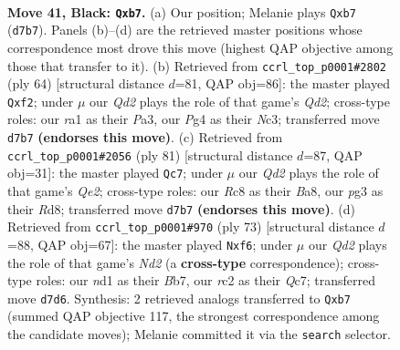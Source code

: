 \documentclass[11pt]{article}
\begin{document}
\begin{figure}[p]
\label{fig:thought-m79}
\end{figure}

\clearpage

\begin{figure}[p]\centering
\begin{subfigure}{0.46\textwidth}\centering
\resizebox{\linewidth}{!}{%
\newchessgame
\chessboard[
  setfen={n1rb2k1/1B1q2n1/p4r2/P1p2p1p/3p1Pp1/1P4P1/2RBP2P/RQ1NN1K1 b - - 0 41},
  showmover=false,
  pgfstyle=straightmove, color=movearrow, markmove={d7-b7}
]}
\caption{}
\end{subfigure}\hfill
\begin{subfigure}{0.46\textwidth}\centering
\resizebox{\linewidth}{!}{%
\newchessgame
\chessboard[
  setfen={k2q2r1/1b3pr1/ppnpp3/8/4PP1p/PPNB3P/1P1Q1bP1/4R1RK w - - 0 33},
  showmover=false,
  pgfstyle=straightmove, color=movearrow, markmove={d2-f2}
]}
\caption{}
\end{subfigure}
\\[4pt]
\begin{subfigure}{0.46\textwidth}\centering
\resizebox{\linewidth}{!}{%
\newchessgame
\chessboard[
  setfen={b2r2k1/4q1p1/1p1pprn1/6b1/PpP4p/1P3P1P/2Q1N1PB/R2R1B1K b - - 3 41},
  showmover=false,
  pgfstyle=straightmove, color=movearrow, markmove={e7-c7}
]}
\caption{}
\end{subfigure}\hfill
\begin{subfigure}{0.46\textwidth}\centering
\resizebox{\linewidth}{!}{%
\newchessgame
\chessboard[
  setfen={3rr1k1/1bqn1pp1/pp1ppB1p/8/P1P1PP2/1PN3PP/2Q1R1B1/3R3K b - - 0 37},
  showmover=false,
  pgfstyle=straightmove, color=movearrow, markmove={d7-f6}
]}
\caption{}
\end{subfigure}
\caption{\textbf{Move 41, Black: \texttt{Qxb7}.} (a) Our position; Melanie plays \texttt{Qxb7} (\texttt{d7b7}). Panels (b)--(d) are the retrieved master positions whose correspondence most drove this move (highest QAP objective among those that transfer to it). (b) Retrieved from \texttt{ccrl\_top\_p0001\#2802} (ply 64) [structural distance $d$=81, QAP obj=86]: the master played \texttt{Qxf2}; under $\mu$ our \emph{Qd2} plays the role of that game's \emph{Qd2}; cross-type roles: our \emph{r}a1 as their \emph{P}a3, our \emph{P}g4 as their \emph{N}c3; transferred move \texttt{d7b7} \textbf{(endorses this move)}. (c) Retrieved from \texttt{ccrl\_top\_p0001\#2056} (ply 81) [structural distance $d$=87, QAP obj=31]: the master played \texttt{Qc7}; under $\mu$ our \emph{Qd2} plays the role of that game's \emph{Qe2}; cross-type roles: our \emph{R}c8 as their \emph{B}a8, our \emph{p}g3 as their \emph{R}d8; transferred move \texttt{d7b7} \textbf{(endorses this move)}. (d) Retrieved from \texttt{ccrl\_top\_p0001\#970} (ply 73) [structural distance $d$=88, QAP obj=67]: the master played \texttt{Nxf6}; under $\mu$ our \emph{Qd2} plays the role of that game's \emph{Nd2} (a \textbf{cross-type} correspondence); cross-type roles: our \emph{n}d1 as their \emph{B}b7, our \emph{r}c2 as their \emph{Q}c7; transferred move \texttt{d7d6}. Synthesis: 2 retrieved analogs transferred to \texttt{Qxb7} (summed QAP objective 117, the strongest correspondence among the candidate moves); Melanie committed it via the \texttt{search} selector.}

\end{figure}
\end{document}
